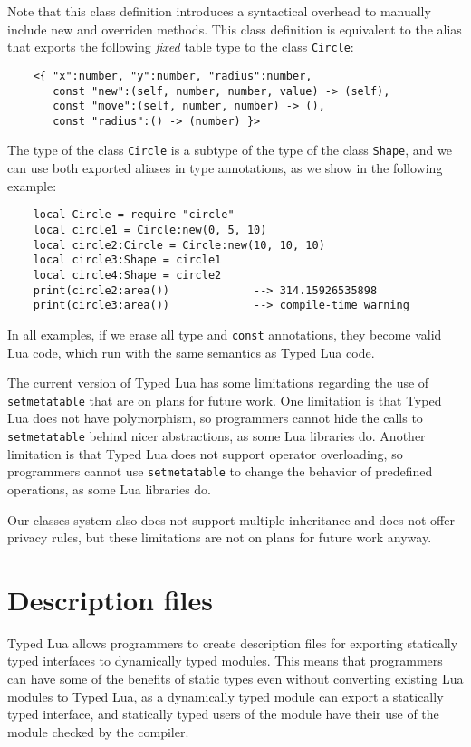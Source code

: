 Note that this class definition introduces a syntactical overhead
to manually include new and overriden methods.
This class definition is equivalent to the alias that exports the
following \emph{fixed} table type to the class \texttt{Circle}:
\begin{verbatim}
    <{ "x":number, "y":number, "radius":number,
       const "new":(self, number, number, value) -> (self),
       const "move":(self, number, number) -> (),
       const "radius":() -> (number) }>
\end{verbatim}

The type of the class \texttt{Circle} is a subtype of the type of
the class \texttt{Shape}, and we can use both exported aliases in type
annotations, as we show in the following example:
\begin{verbatim}
    local Circle = require "circle"
    local circle1 = Circle:new(0, 5, 10)
    local circle2:Circle = Circle:new(10, 10, 10)
    local circle3:Shape = circle1
    local circle4:Shape = circle2
    print(circle2:area())             --> 314.15926535898
    print(circle3:area())             --> compile-time warning
\end{verbatim}

In all examples, if we erase all type and \texttt{const} annotations,
they become valid Lua code, which run with the same semantics as Typed Lua code.

The current version of Typed Lua has some limitations regarding
the use of \texttt{setmetatable} that are on plans for future work.
One limitation is that Typed Lua does not have polymorphism,
so programmers cannot hide the calls to \texttt{setmetatable} behind
nicer abstractions, as some Lua libraries do.
Another limitation is that Typed Lua does not support operator overloading,
so programmers cannot use \texttt{setmetatable} to change the behavior
of predefined operations, as some Lua libraries do.

Our classes system also does not support multiple inheritance
and does not offer privacy rules, but these limitations are not
on plans for future work anyway.

\section{Description files}
\label{sec:tld}

Typed Lua allows programmers to create description files
for exporting statically typed interfaces to dynamically typed modules.
This means that programmers can have some of the benefits of
static types even without converting existing Lua modules to Typed Lua,
as a dynamically typed module can export a statically typed interface,
and statically typed users of the module have their use of the module
checked by the compiler.

